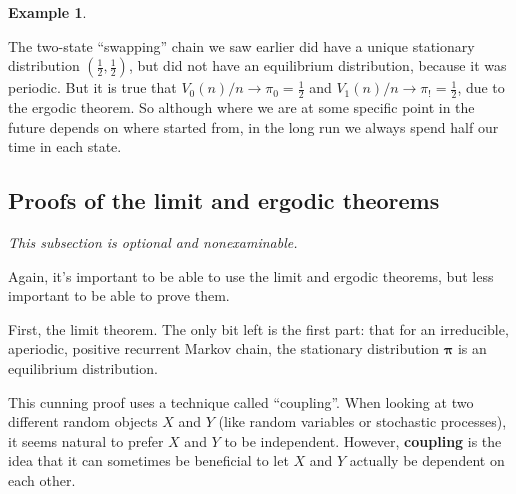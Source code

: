 \documentclass[
  a4paper,
]{article}
\theoremstyle{definition}
\theoremstyle{definition}
\newtheorem{example}{Example}[section]
\theoremstyle{definition}
\theoremstyle{remark}
\begin{document}
\begin{example}
\protect\hypertarget{exm:ergodic-ex2}{}\label{exm:ergodic-ex2}

The two-state ``swapping'' chain we saw earlier did have a unique stationary distribution \((\frac12, \frac12)\), but did not have an equilibrium distribution, because it was periodic. But it is true that \(V_0(n)/n \to \pi_0 = \frac12\) and \(V_1(n)/n \to \pi_! = \frac12\), due to the ergodic theorem. So although where we are at some specific point in the future depends on where started from, in the long run we always spend half our time in each state.

\end{example}

\hypertarget{S11-proofs}{%
\subsection{Proofs of the limit and ergodic theorems}\label{S11-proofs}}

\emph{This subsection is optional and nonexaminable.}

Again, it's important to be able to use the limit and ergodic theorems, but less important to be able to prove them.

First, the limit theorem. The only bit left is the first part: that for an irreducible, aperiodic, positive recurrent Markov chain, the stationary distribution \(\boldsymbol\pi\) is an equilibrium distribution.

This cunning proof uses a technique called ``coupling''. When looking at two different random objects \(X\) and \(Y\) (like random variables or stochastic processes), it seems natural to prefer \(X\) and \(Y\) to be independent. However, \textbf{coupling} is the idea that it can sometimes be beneficial to let \(X\) and \(Y\) actually be dependent on each other.
\end{document}
